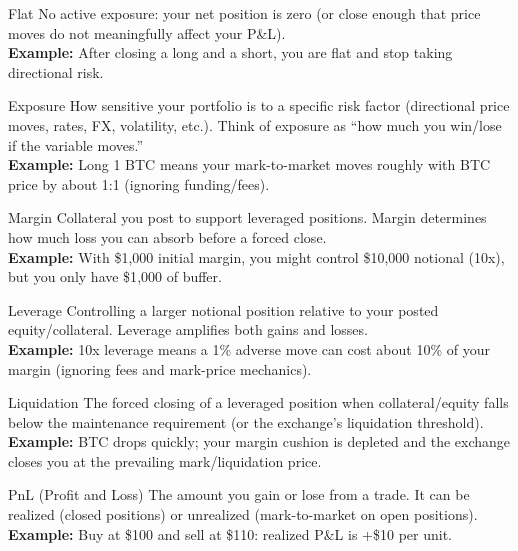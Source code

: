 \begin{keyterm}{Flat}
No active exposure: your net position is zero (or close enough that price moves do not
meaningfully affect your P\&L).
\\\textbf{Example:} After closing a long and a short, you are flat and stop taking directional risk.
\end{keyterm}

\begin{keyterm}{Exposure}
How sensitive your portfolio is to a specific risk factor (directional price moves, rates, FX,
volatility, etc.). Think of exposure as ``how much you win/lose if the variable moves.''
\\\textbf{Example:} Long 1 BTC means your mark-to-market moves roughly with BTC price by about 1:1
(ignoring funding/fees).
\end{keyterm}

\begin{keyterm}{Margin}
Collateral you post to support leveraged positions. Margin determines how much loss you
can absorb before a forced close.
\\\textbf{Example:} With \$1{,}000 initial margin, you might control \$10{,}000 notional (10x),
but you only have \$1{,}000 of buffer.
\end{keyterm}

\begin{keyterm}{Leverage}
Controlling a larger notional position relative to your posted equity/collateral.
Leverage amplifies both gains and losses.
\\\textbf{Example:} 10x leverage means a 1\% adverse move can cost about 10\% of your margin
(ignoring fees and mark-price mechanics).
\end{keyterm}

\begin{keyterm}{Liquidation}
The forced closing of a leveraged position when collateral/equity falls below the
maintenance requirement (or the exchange's liquidation threshold).
\\\textbf{Example:} BTC drops quickly; your margin cushion is depleted and the exchange closes you
at the prevailing mark/liquidation price.
\end{keyterm}

\begin{keyterm}{PnL (Profit and Loss)}
The amount you gain or lose from a trade. It can be realized (closed positions) or
unrealized (mark-to-market on open positions).
\\\textbf{Example:} Buy at \$100 and sell at \$110: realized P\&L is +\$10 per unit.
\end{keyterm}

